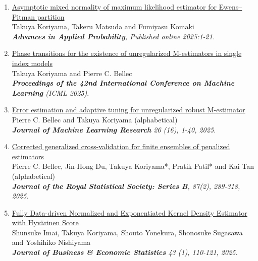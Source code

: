 \documentclass[10pt]{amsart}
\begin{document}
\begin{enumerate}
  \item \href{https://doi.org/10.1017/apr.2025.10020}
  {Asymptotic mixed normality of maximum likelihood estimator for Ewens--Pitman partition}\\
  Takuya Koriyama, Takeru Matsuda and Fumiyasu Komaki\\
  \textit{\textbf{Advances in Applied Probability}, Published online 2025:1-21.}

  \item \href{https://arxiv.org/abs/2501.03163}{Phase transitions for the existence of unregularized M-estimators in single index models} \\
  Takuya Koriyama and Pierre C. Bellec\\
  \textit{\textbf{Proceedings of the 42nd International Conference on Machine
Learning} (ICML 2025)}.

  \item \href{https://jmlr.org/papers/v26/24-0060.html}{Error estimation and adaptive tuning for unregularized robust M-estimator}\\
  Pierre C. Bellec and Takuya Koriyama (alphabetical)\\
  \textit{\textbf{Journal of Machine Learning Research}  26 (16), 1-40, 2025.} 

  \item \href{https://doi.org/10.1093/jrsssb/qkae092}{Corrected generalized cross-validation for finite ensembles of penalized estimators}\\
  Pierre C. Bellec, Jin-Hong Du, Takuya Koriyama*, Pratik Patil* and Kai Tan (alphabetical)\\
  \textit{\textbf{Journal of the Royal Statistical Society: Series B}, 87(2), 289-318, 2025.} 

  \item  \href{https://www.tandfonline.com/doi/full/10.1080/07350015.2024.2326149?casa_token=_YOXJFqGXa0AAAAA%3AZCueJ9QbEp0N1Yvh8Bm0ieEefDcQECfZyzYWfPd2KTI_yxy9l7rt0cja6c5I4cyVJuAT7q2sfTzo}{Fully Data-driven Normalized and Exponentiated Kernel Density Estimator with Hyvärinen Score}\\
  Shunsuke Imai, Takuya Koriyama, Shouto Yonekura, Shonosuke Sugasawa and Yoshihiko Nishiyama\\
  \textit{\textbf{Journal of Business \& Economic Statistics} 43 (1), 110-121, 2025.
  }
\end{enumerate}

\end{document}
